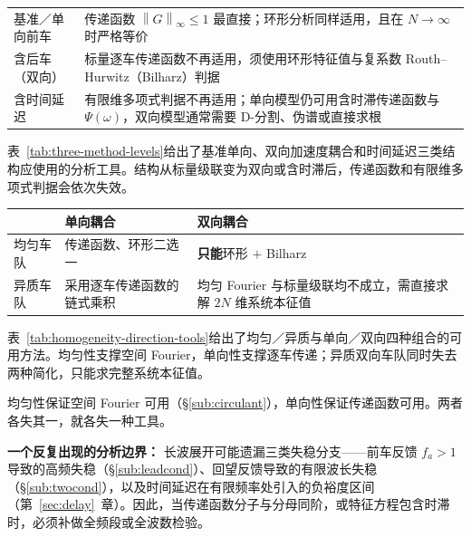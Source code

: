 \documentclass[11pt,a4paper,openany]{book}
\numberwithin{equation}{chapter}
\numberwithin{figure}{chapter}
\numberwithin{table}{chapter}
\newcommand{\tabletext}[2]{%
  \par\smallskip\noindent
  表~\ref{#1}给出了#2
  \par\smallskip
}
\begin{document}
\begin{tcolorbox}[keybox,title=\textbf{线索三：方法的三级台阶}]
\begin{center}
\small
{}
\label{tab:three-method-levels}
\begin{tabular}{p{4.2cm}p{9.6cm}}
\toprule
基准／单向前车 & 传递函数 $\left\|G\right\|_\infty\le1$ 最直接；环形分析同样适用，且在 $N\to\infty$ 时严格等价 \\[4pt]
含后车（双向） & 标量逐车传递函数不再适用，须使用环形特征值与复系数 Routh--Hurwitz（Bilharz）判据 \\[4pt]
含时间延迟 & 有限维多项式判据不再适用；单向模型仍可用含时滞传递函数与 $\Psi(\omega)$，双向模型通常需要 D-分割、伪谱或直接求根 \\
\bottomrule
\end{tabular}
\end{center}
\tabletext{tab:three-method-levels}{基准单向、双向加速度耦合和时间延迟三类结构应使用的分析工具。结构从标量级联变为双向或含时滞后，传递函数和有限维多项式判据会依次失效。}
\end{tcolorbox}

\begin{tcolorbox}[notebox,title=\textbf{线索三的推论：均匀性与耦合方向决定用哪种工具}]
\begin{center}
\small
{}
\label{tab:homogeneity-direction-tools}
\begin{tabular}{p{3.4cm}p{4.8cm}p{5.2cm}}
\toprule
& \textbf{单向耦合} & \textbf{双向耦合} \\
\midrule
均匀车队 & 传递函数、环形二选一 & \textbf{只能}环形 $+$ Bilharz \\[3pt]
异质车队 & 采用逐车传递函数的链式乘积 & 均匀 Fourier 与标量级联均不成立，需直接求解 $2N$ 维系统本征值 \\
\bottomrule
\end{tabular}
\end{center}
\tabletext{tab:homogeneity-direction-tools}{均匀／异质与单向／双向四种组合的可用方法。均匀性支撑空间 Fourier，单向性支撑逐车传递；异质双向车队同时失去两种简化，只能求完整系统本征值。}
均匀性保证空间 Fourier 可用（\S\ref{sub:circulant}），单向性保证传递函数可用。两者各失其一，就各失一种工具。
\end{tcolorbox}

\vspace{0.6em}
\textbf{一个反复出现的分析边界：} 长波展开可能遗漏三类失稳分支——前车反馈 $f_a>1$ 导致的高频失稳（\S\ref{sub:leadcond}）、回望反馈导致的有限波长失稳（\S\ref{sub:twocond}），以及时间延迟在有限频率处引入的负裕度区间（第~\ref{sec:delay}~章）。因此，当传递函数分子与分母同阶，或特征方程包含时滞时，必须补做全频段或全波数检验。
\end{document}
